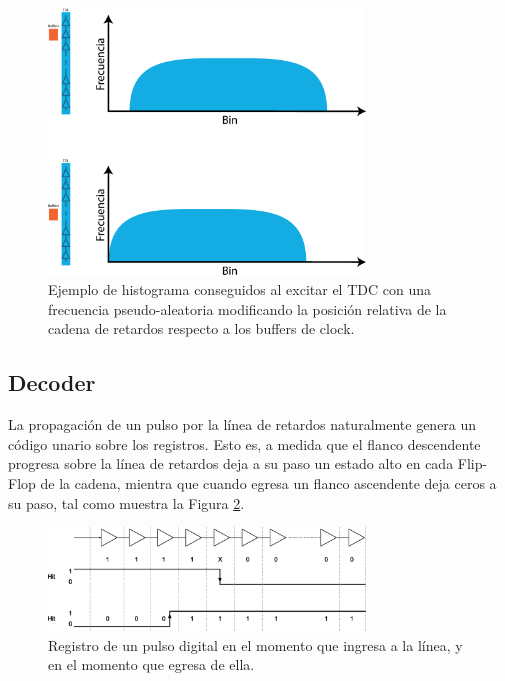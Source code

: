 \begin{figure}[H]
     \centering
     \includegraphics[width=0.75\textwidth]{imagenes/problema_buffer.eps}
     \caption{Ejemplo de histograma conseguidos al excitar el TDC con una frecuencia pseudo-aleatoria 
     modificando la posición relativa de la cadena de retardos respecto a los buffers de clock.}
     \label{fig: problema buffer}
\end{figure}

\subsection{Decoder}
La propagación de un pulso por la línea de retardos naturalmente genera un código unario sobre los registros. Esto
es, a medida que el flanco descendente progresa sobre la línea de retardos deja a su paso un estado alto en cada Flip-Flop de la cadena, mientra que
cuando egresa un flanco ascendente deja ceros a su paso, tal como muestra la Figura \ref{fig: tdl_flancos}.

\begin{figure}[H]
     \centering
     \includegraphics[width=0.75\textwidth]{imagenes/tdl_flancos.eps}
     \caption{Registro de un pulso digital en el momento que ingresa a la línea, y en el momento
     que egresa de ella.}
     \label{fig: tdl_flancos}
\end{figure}

